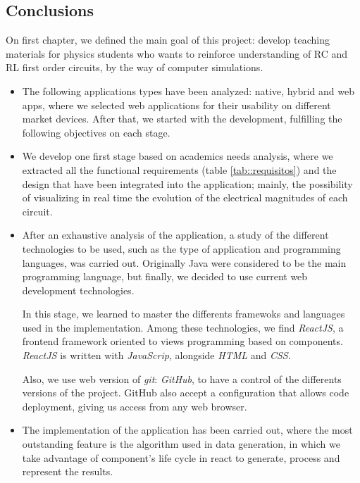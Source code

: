\documentclass[../main.tex]{subfiles}
\begin{document}
\subsection{Conclusions}

On first chapter, we defined the main goal of this project: develop teaching materials for physics students who wants to reinforce understanding of RC and RL first order circuits, by the way of computer simulations.


\begin{itemize}
    
    \item The following applications types have been analyzed: native, hybrid and web apps, where we selected web applications for their usability on different market devices. After that, we started with the development, fulfilling the following objectives on each stage.
    
    \item We develop one first stage based on academics needs analysis, where we extracted all the functional requirements (table \ref{tab::requisitos}) and the design that have been integrated into the application;  mainly, the possibility of visualizing in real time the evolution of the electrical magnitudes of each circuit.    

    \item After an exhaustive analysis of the application, a study of the different technologies to be used, such as the type of application and programming languages, was carried out. Originally Java were considered to be the main programming language, but finally, we decided to use current web development technologies.
    
    In this stage, we learned to master the differents framewoks and languages used in the implementation. Among these technologies, we find \textit{ReactJS}, a frontend framework oriented to views programming based on components. \textit{ReactJS} is written with \textit{JavaScrip}, alongside \textit{HTML} and \textit{CSS}.
        
    Also, we use web version of \textit{git}: \textit{GitHub}, to have a control of the differents versions of the project. GitHub also accept a configuration that allows code deployment, giving us access from any web browser.

    \item The implementation of the application has been carried out, where the most outstanding feature is the algorithm used in data generation, in which we take advantage of component's life cycle in react to generate, process and represent the results.
    

\end{itemize}
\end{document}
